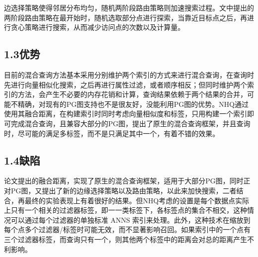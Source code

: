 \documentclass[12pt,UTF8,AutoFakeBold=2,a4paper]{ctexart} %
\begin{document}
边选择策略使得邻居分布均匀，随机两阶段路由策略则加速搜索过程。文中提出的两阶段路由策略在最开始时，随机选取部分点进行探索，当靠近目标点之后，再进行贪心策略进行搜索，从而减少访问点的次数以及计算量。



{\subsection{1.3优势}}
目前的混合查询方法基本采用分别维护两个索引的方式来进行混合查询，在查询时先进行向量相似化搜索，之后再进行属性过滤，或者顺序相反；但同时维护两个索引的方法，会产生不必要的内存花销和计算，查询结果依赖于两个结果的合并，可能不精确，对现有的PG图支持也不是很友好，没能利用PG图的优势。NHQ通过使用其融合距离，在构建索引时同时考虑向量相似度和标签，只用构建一个索引即可完成混合查询，且兼容大部分的PG图，提出了原生的混合查询框架，并且查询时，尽可能的满足多标签，而不是只满足其中一个，有着不错的效果。


{\subsection{1.4缺陷}}
论文提出的融合距离，实现了原生的混合查询框架，适用于大部分PG图，同时正对PG图，又提出了新的边缘选择策略以及路由策略，以此来加快搜索，二者结合，再最终的实验表现上有着很好的结果。但NHQ考虑的设置是每个数据点实际上只有一个相关的过滤器标签，即一一类标签下，各标签点的集合不相交，这种情况可以通过每个过滤器的单独标准 ANNS 索引来处理。此外，这种技术在缩放到每个点多个过滤器/标签时可能无效，而不显著影响召回。如果索引中的一个点有三个过滤器标签，而查询只有一个，则其他两个标签中的距离会对总的距离产生不利影响。
\end{document}
